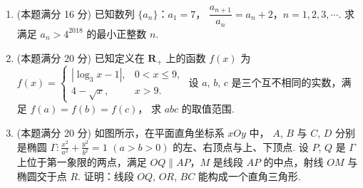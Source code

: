 \documentclass{chsmc}
\begin{document}
\begin{enumerate}[resume]
  \item (本题满分 16 分) 已知数列 $\{a_n\}$：$a_1 = 7$，
    $\dfrac{a_{n+1}}{a_n} = a_n + 2$，$n = 1, 2, 3, \cdots$.
    求满足 $a_n > 4^{2018}$ 的最小正整数 $n$.
  \item (本题满分 20 分) 已知定义在 $\mathbf{R}_+$ 上的函数 $f(x)$ 为
    $f(x) = \begin{cases}
      |\log_3 x - 1|, & 0 < x \leqslant 9, \\
      4 - \sqrt{x}, & x > 9.
    \end{cases}$
    设 $a$, $b$, $c$ 是三个互不相同的实数，满足 $f(a) = f(b) = f(c)$，
    求 $abc$ 的取值范围.
  \item (本题满分 20 分) 如图所示，在平面直角坐标系 $xOy$ 中，
    $A$, $B$ 与 $C$, $D$ 分别是椭圆
    $\Gamma\colon \frac{x^2}{a^2} + \frac{y^2}{b^2} = 1$ $(a > b > 0)$
    的左、右顶点与上、下顶点.
    设 $P$, $Q$ 是 $\Gamma$ 上位于第一象限的两点，满足
    $OQ \parallel AP$，$M$ 是线段 $AP$ 的中点，射线 $OM$ 与椭圆交于点 $R$.
    证明：线段 $OQ$, $OR$, $BC$ 能构成一个直角三角形.
\end{enumerate}
\end{document}
